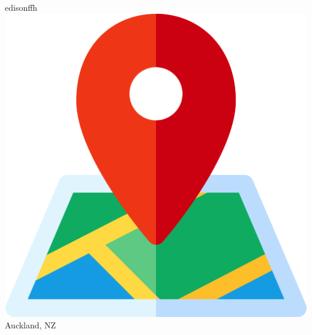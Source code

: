 \begin{center}
    edisonffh
    \hspace*{5mm}
    \includegraphics[scale=0.03]{figs/map.png}
    Auckland, NZ
\end{center}
